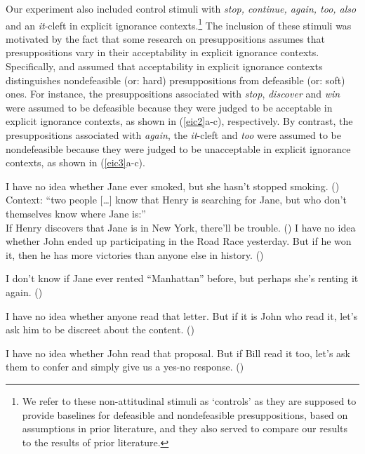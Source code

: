 \documentclass[11pt,fleqn]{article}
\def\verymarginal{{\leavevmode\llap{??}}}
\def\infelic{{\leavevmode\llap{\#}}}
\newcommand{\6}{\mbox{$[\hspace*{-.6mm}[$}}
\newcommand{\9}{\mbox{$]\hspace*{-.6mm}]$}}
\begin{document}
Our experiment also included control stimuli with \emph{stop, continue, again, too, also} and an {\em it}-cleft in explicit ignorance contexts.\footnote{We refer to these non-attitudinal stimuli as `controls' as they are supposed to provide baselines for defeasible and nondefeasible presuppositions, based on assumptions in prior literature, and they also served to compare our results to the results of prior literature.} The inclusion of these stimuli was motivated by the fact that some research on presuppositions assumes that presuppositions vary in their acceptability in explicit ignorance contexts. Specifically, \citealt{simons01} and \citealt{abusch10} assumed that acceptability in explicit ignorance contexts distinguishes nondefeasible (or: hard) presuppositions from defeasible (or: soft) ones. For instance, the presuppositions associated with \emph{stop}, \emph{discover} and \emph{win} were assumed to be defeasible because they were judged to be acceptable in explicit ignorance contexts, as shown in (\ref{eic2}a-c), respectively. By contrast, the presuppositions associated with \emph{again}, the \emph{it}-cleft and \emph{too} were assumed to be nondefeasible because they were judged to be unacceptable in explicit ignorance contexts, as shown in (\ref{eic3}a-c).

\begin{exe}
\ex\label{eic2}
\begin{xlist}
\ex I have no idea whether Jane ever smoked, but she hasn't stopped smoking. \hfill (\citealt[443]{simons01})
\ex Context: ``two people [\ldots] know that Henry is searching for Jane, but who don't themselves know where Jane is:'' \\ If Henry discovers that Jane is in New York, there'll be trouble. \hfill (\citealt[434]{simons01})
\ex I have no idea whether John ended up participating in the
Road Race yesterday. But if he won it, then he has more victories than anyone else in history. \hfill (\citealt[39]{abusch10})
\end{xlist}
\ex\label{eic3}
\begin{xlist}
\ex\infelic I don't know if Jane ever rented ``Manhattan'' before, but perhaps she's renting it again. \hfill (\citealt[443]{simons01})

\ex \verymarginal I have no idea whether anyone read that letter. But if it is John
who read it, let's ask him to be discreet about the content. \hfill (\citealt[40]{abusch10})

\ex \verymarginal I have no idea whether John read that proposal. But if Bill read it too, let's ask them to confer and simply give us a yes-no response. \hfill (\citealt[40]{abusch10})
\end{xlist}
\end{exe}
\end{document}
